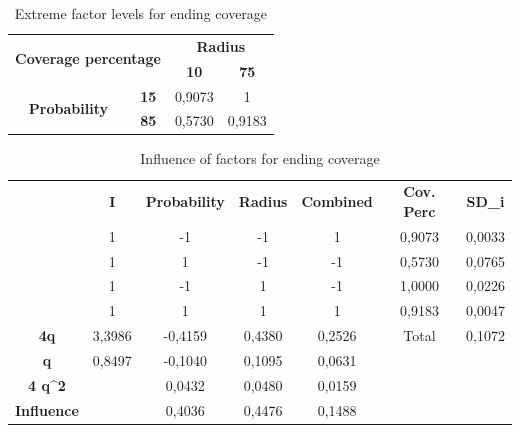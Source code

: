\begin{table}[h!]
\centering
\begin{tabular}{|cc|cc|}
\hline
\multicolumn{2}{|c|}{\multirow{2}{*}{\textbf{Coverage percentage}}} & \multicolumn{2}{c|}{\textbf{Radius}} \\ \cline{3-4} 
\multicolumn{2}{|c|}{} & \multicolumn{1}{c|}{\textbf{10}} & \textbf{75} \\ \hline
\multicolumn{1}{|c|}{\multirow{2}{*}{\textbf{Probability}}} & \textbf{15} & \multicolumn{1}{c|}{0,9073} & 1 \\ \cline{2-4} 
\multicolumn{1}{|c|}{} & \textbf{85} & \multicolumn{1}{c|}{0,5730} & 0,9183 \\ \hline
\end{tabular}
\caption{Extreme factor levels for ending coverage}
\label{tab:extreme-factors-end-coverage}
\end{table}

\begin{table}[H]
\centering
\begin{tabular}{c|c|c|c|c|cc}
\cline{2-7}
 & \textbf{I} & \textbf{Probability} & \textbf{Radius} & \textbf{Combined} & \multicolumn{1}{c|}{\textbf{Cov. Perc}} & \multicolumn{1}{c|}{\textbf{SD\_i}} \\ \cline{2-7} 
 & 1 & -1 & -1 & 1 & \multicolumn{1}{c|}{0,9073} & \multicolumn{1}{c|}{0,0033} \\ \cline{2-7} 
 & 1 & 1 & -1 & -1 & \multicolumn{1}{c|}{0,5730} & \multicolumn{1}{c|}{0,0765} \\ \cline{2-7} 
 & 1 & -1 & 1 & -1 & \multicolumn{1}{c|}{1,0000} & \multicolumn{1}{c|}{0,0226} \\ \cline{2-7} 
 & 1 & 1 & 1 & 1 & \multicolumn{1}{c|}{0,9183} & \multicolumn{1}{c|}{0,0047} \\ \hline
\multicolumn{1}{|c|}{\textbf{4q}} & 3,3986 & -0,4159 & 0,4380 & 0,2526 & \multicolumn{1}{c|}{Total} & \multicolumn{1}{c|}{0,1072} \\ \hline
\multicolumn{1}{|c|}{\textbf{q}} & 0,8497 & -0,1040 & 0,1095 & 0,0631 &  &  \\ \cline{1-5}
\multicolumn{1}{|c|}{\textbf{4 q\textasciicircum{}2}} &  & 0,0432 & 0,0480 & 0,0159 &  &  \\ \cline{1-5}
\multicolumn{1}{|c|}{\textbf{Influence}} &  & 0,4036 & 0,4476 & 0,1488 &  &  \\ \cline{1-5}
\end{tabular}
\caption{Influence of factors for ending coverage}
\label{tab:influence-on-end-coverage}
\end{table}


